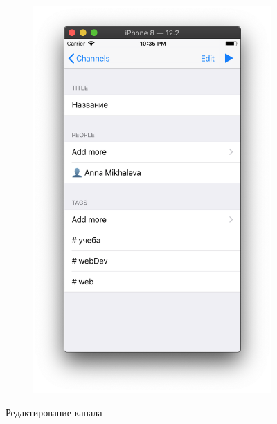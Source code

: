 \documentclass[a4paper,12pt]{article}
\begin{document}
\begin{figure}[h!]
\begin{subfigure}[b]{0.3\linewidth}
			\includegraphics[width=\linewidth]{../includes/pmi/after_editing.png}
		\end{subfigure}
		\caption{\label{pic: editChannl}Редактирование канала}
	\end{figure}
	\clearpage
\end{document}
